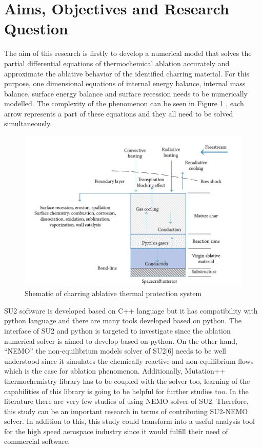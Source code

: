 \documentclass[12pt]{article}
\begin{document}
\section{Aims, Objectives and Research Question}
The aim of this research is firstly to develop a numerical model that solves the partial differential equations of thermochemical ablation accurately and approximate the  ablative behavior of the identified charring material. For this purpose, one dimensional equations of internal energy balance, internal mass balance, surface energy balance and surface recession needs to be numerically modelled. The complexity of the phenomenon can be seen in Figure \ref{fig:char_model} , each arrow represents a part of these equations and they all need to be solved simultaneously. \newline
\begin{figure}[h!]
  \includegraphics[width=\linewidth]{char_model.jpg}
  \caption{Shematic of charring ablative thermal protection system}
  \label{fig:char_model}
\end{figure}
SU2 software is developed based on C++ language but it has compatibility with python language and there are many tools developed based on python.  The interface of SU2 and python is targeted to investigate since the ablation numerical solver is aimed to develop based on python. On the other hand, “NEMO” the non-equilibrium models solver of SU2[6] needs to be well understood since it simulates the chemically reactive and non-equilibrium flows which is the case for ablation phenomenon. Additionally, Mutation++ thermochemistry library has to be coupled with the solver too, learning of the capabilities of this library is going to be helpful for further studies too. \newline
In the literature there are very few studies of using NEMO solver of SU2. Therefore, this study can be an important research in terms of contributing SU2-NEMO solver. In addition to this, this study could transform into a useful analysis tool for the high speed aerospace industry since it would fulfill their need of commercial software. 
\end{document}
